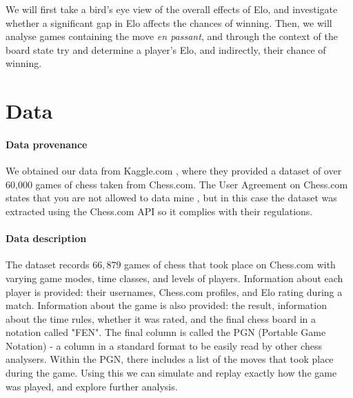 \documentclass[10pt,a4paper]{article}
\begin{document}
\begin{multicols}{2}
We will first take a bird's eye view of the overall effects of Elo, and investigate whether a significant gap in Elo affects the chances of winning. Then, we will analyse games containing the move \textit{en passant}, and through the context of the board state try and determine a player's Elo, and indirectly, their chance of winning.

\section{Data}

\paragraph{Data provenance}
We obtained our data from Kaggle.com \cite{Kaggle}, where they provided a dataset of over 60,000 games of chess taken from Chess.com. The User Agreement on Chess.com states that you are not allowed to data mine \cite{ChessT&C}, but in this case the dataset was extracted using the Chess.com API so it complies with their regulations.


\paragraph{Data description}
The dataset records $66,879$ games of chess that took place on Chess.com with varying game modes, time classes, and levels of players. Information about each player is provided: their usernames, Chess.com profiles, and Elo rating during a match. Information about the game is also provided: the result, information about the time rules, whether it was rated, and the final chess board in a notation called "FEN". The final column is called the PGN (Portable Game Notation) - a column in a standard format to be easily read by other chess analysers. Within the PGN, there includes a list of the moves that took place during the game. Using this we can simulate and replay exactly how the game was played, and explore further analysis.



\end{multicols}
\end{document}

